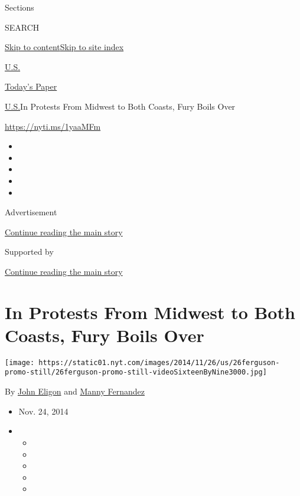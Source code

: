 Sections

SEARCH

\protect\hyperlink{site-content}{Skip to
content}\protect\hyperlink{site-index}{Skip to site index}

\href{https://www.nytimes.com/section/us}{U.S.}

\href{https://myaccount.nytimes.com/auth/login?response_type=cookie\&client_id=vi}{}

\href{https://www.nytimes.com/section/todayspaper}{Today's Paper}

\href{/section/us}{U.S.}\textbar{}In Protests From Midwest to Both
Coasts, Fury Boils Over

\url{https://nyti.ms/1yaaMFm}

\begin{itemize}
\item
\item
\item
\item
\item
\end{itemize}

Advertisement

\protect\hyperlink{after-top}{Continue reading the main story}

Supported by

\protect\hyperlink{after-sponsor}{Continue reading the main story}

\hypertarget{in-protests-from-midwest-to-both-coasts-fury-boils-over}{%
\section{In Protests From Midwest to Both Coasts, Fury Boils
Over}\label{in-protests-from-midwest-to-both-coasts-fury-boils-over}}

\texttt{[image: https://static01.nyt.com/images/2014/11/26/us/26ferguson-promo-still/26ferguson-promo-still-videoSixteenByNine3000.jpg]}

By \href{http://www.nytimes.com/by/john-eligon}{John Eligon} and
\href{http://www.nytimes.com/by/manny-fernandez}{Manny Fernandez}

\begin{itemize}
\item
  Nov. 24, 2014
\item
  \begin{itemize}
  \item
  \item
  \item
  \item
  \item
  \end{itemize}
\end{itemize}

